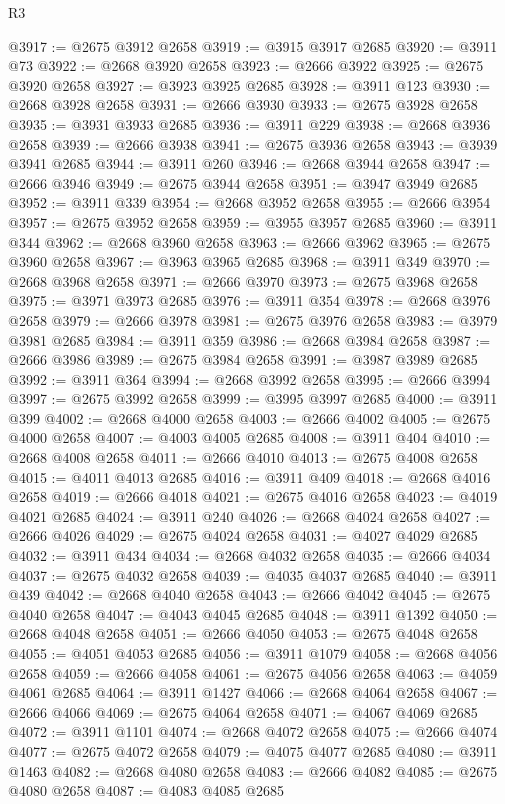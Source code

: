 \begin{lexlean}{R3}
\begin{coremodule}
@3917 := @2675 @3912 @2658
@3919 := @3915 @3917 @2685
@3920 := @3911 @73
@3922 := @2668 @3920 @2658
@3923 := @2666 @3922
@3925 := @2675 @3920 @2658
@3927 := @3923 @3925 @2685
@3928 := @3911 @123
@3930 := @2668 @3928 @2658
@3931 := @2666 @3930
@3933 := @2675 @3928 @2658
@3935 := @3931 @3933 @2685
@3936 := @3911 @229
@3938 := @2668 @3936 @2658
@3939 := @2666 @3938
@3941 := @2675 @3936 @2658
@3943 := @3939 @3941 @2685
@3944 := @3911 @260
@3946 := @2668 @3944 @2658
@3947 := @2666 @3946
@3949 := @2675 @3944 @2658
@3951 := @3947 @3949 @2685
@3952 := @3911 @339
@3954 := @2668 @3952 @2658
@3955 := @2666 @3954
@3957 := @2675 @3952 @2658
@3959 := @3955 @3957 @2685
@3960 := @3911 @344
@3962 := @2668 @3960 @2658
@3963 := @2666 @3962
@3965 := @2675 @3960 @2658
@3967 := @3963 @3965 @2685
@3968 := @3911 @349
@3970 := @2668 @3968 @2658
@3971 := @2666 @3970
@3973 := @2675 @3968 @2658
@3975 := @3971 @3973 @2685
@3976 := @3911 @354
@3978 := @2668 @3976 @2658
@3979 := @2666 @3978
@3981 := @2675 @3976 @2658
@3983 := @3979 @3981 @2685
@3984 := @3911 @359
@3986 := @2668 @3984 @2658
@3987 := @2666 @3986
@3989 := @2675 @3984 @2658
@3991 := @3987 @3989 @2685
@3992 := @3911 @364
@3994 := @2668 @3992 @2658
@3995 := @2666 @3994
@3997 := @2675 @3992 @2658
@3999 := @3995 @3997 @2685
@4000 := @3911 @399
@4002 := @2668 @4000 @2658
@4003 := @2666 @4002
@4005 := @2675 @4000 @2658
@4007 := @4003 @4005 @2685
@4008 := @3911 @404
@4010 := @2668 @4008 @2658
@4011 := @2666 @4010
@4013 := @2675 @4008 @2658
@4015 := @4011 @4013 @2685
@4016 := @3911 @409
@4018 := @2668 @4016 @2658
@4019 := @2666 @4018
@4021 := @2675 @4016 @2658
@4023 := @4019 @4021 @2685
@4024 := @3911 @240
@4026 := @2668 @4024 @2658
@4027 := @2666 @4026
@4029 := @2675 @4024 @2658
@4031 := @4027 @4029 @2685
@4032 := @3911 @434
@4034 := @2668 @4032 @2658
@4035 := @2666 @4034
@4037 := @2675 @4032 @2658
@4039 := @4035 @4037 @2685
@4040 := @3911 @439
@4042 := @2668 @4040 @2658
@4043 := @2666 @4042
@4045 := @2675 @4040 @2658
@4047 := @4043 @4045 @2685
@4048 := @3911 @1392
@4050 := @2668 @4048 @2658
@4051 := @2666 @4050
@4053 := @2675 @4048 @2658
@4055 := @4051 @4053 @2685
@4056 := @3911 @1079
@4058 := @2668 @4056 @2658
@4059 := @2666 @4058
@4061 := @2675 @4056 @2658
@4063 := @4059 @4061 @2685
@4064 := @3911 @1427
@4066 := @2668 @4064 @2658
@4067 := @2666 @4066
@4069 := @2675 @4064 @2658
@4071 := @4067 @4069 @2685
@4072 := @3911 @1101
@4074 := @2668 @4072 @2658
@4075 := @2666 @4074
@4077 := @2675 @4072 @2658
@4079 := @4075 @4077 @2685
@4080 := @3911 @1463
@4082 := @2668 @4080 @2658
@4083 := @2666 @4082
@4085 := @2675 @4080 @2658
@4087 := @4083 @4085 @2685

\end{coremodule}
\end{lexlean}
